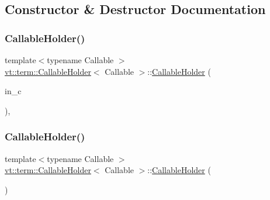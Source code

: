 \subsection{Constructor \& Destructor Documentation}
\mbox{\label{structvt_1_1term_1_1_callable_holder_a69d93533fc725eb0206a34e98395b7f3}} 
\subsubsection{\texorpdfstring{Callable\+Holder()}{CallableHolder()}\hspace{0.1cm}{\footnotesize\ttfamily [1/3]}}
{\footnotesize\ttfamily template$<$typename Callable $>$ \\
\hyperlink{structvt_1_1term_1_1_callable_holder}{vt\+::term\+::\+Callable\+Holder}$<$ Callable $>$\+::\hyperlink{structvt_1_1term_1_1_callable_holder}{Callable\+Holder} (\begin{DoxyParamCaption}\item[{Callable \&\&}]{in\+\_\+c }\end{DoxyParamCaption})\hspace{0.3cm}{\ttfamily [inline]}, {\ttfamily [explicit]}}

\mbox{\label{structvt_1_1term_1_1_callable_holder_a61c0e9929ff96936132fe697d6585992}} 
\subsubsection{\texorpdfstring{Callable\+Holder()}{CallableHolder()}\hspace{0.1cm}{\footnotesize\ttfamily [2/3]}}
{\footnotesize\ttfamily template$<$typename Callable $>$ \\
\hyperlink{structvt_1_1term_1_1_callable_holder}{vt\+::term\+::\+Callable\+Holder}$<$ Callable $>$\+::\hyperlink{structvt_1_1term_1_1_callable_holder}{Callable\+Holder} (\begin{DoxyParamCaption}\item[{\hyperlink{structvt_1_1term_1_1_callable_holder}{Callable\+Holder}$<$ Callable $>$ const \&}]{ }\end{DoxyParamCaption})\hspace{0.3cm}{\ttfamily [delete]}}

